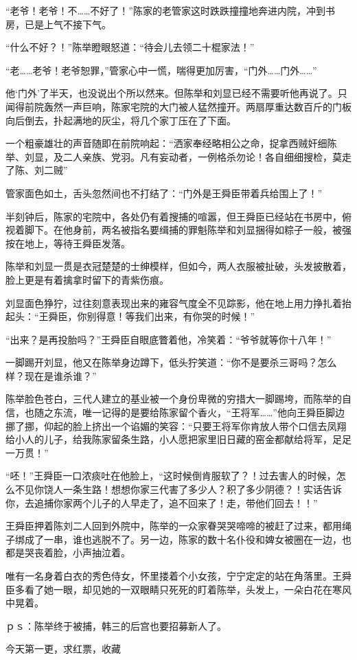 “老爷！老爷！不……不好了！”陈家的老管家这时跌跌撞撞地奔进内院，冲到书房，已是上气不接下气。

“什么不好？！”陈举瞪眼怒道：“待会儿去领二十棍家法！”

“老……老爷！老爷恕罪，”管家心中一慌，喘得更加厉害，“门外……门外……”

他‘门外’了半天，也没说出个所以然来。但陈举和刘显已经不需要听他再说了。只闻得前院轰然一声巨响，陈家宅院的大门被人猛然撞开。两扇厚重达数百斤的门板向后倒去，扑起满地的灰尘，将几个家丁压在了下面。

一个粗豪雄壮的声音随即在前院响起：“洒家奉经略相公之命，捉拿西贼奸细陈举、刘显，及二人亲族、党羽。凡有妄动者，一例格杀勿论！各自细细搜检，莫走了陈、刘二贼”

管家面色如土，舌头忽然间也不打结了：“门外是王舜臣带着兵给围上了！”

半刻钟后，陈家的宅院中，各处仍有着搜捕的喧嚣，但王舜臣已经站在书房中，俯视着脚下。在他身前，两名被指名要缉捕的罪魁陈举和刘显捆得如粽子一般，被强按在地上，等待王舜臣发落。

陈举和刘显一贯是衣冠楚楚的士绅模样，但如今，两人衣服被扯破，头发披散着，脸上更是有着擒拿时留下的青紫伤痕。

刘显面色狰狞，过往刻意表现出来的雍容气度全不见踪影，他在地上用力挣扎着抬起头：“王舜臣，你别得意！等我们出来，有你哭的时候！”

“出来？是再投胎吗？”王舜臣自眼底瞥着他，冷笑着：“爷爷就等你十八年！”

一脚踢开刘显，他又在陈举身边蹲下，低头狞笑道：“你不是要杀三哥吗？怎么样？现在是谁杀谁？”

陈举脸色苍白，三代人建立的基业被一个身份卑微的穷措大一脚踢垮，而陈举的自信，也随之东流，唯一记得的是要给陈家留个香火，“王将军……”他向王舜臣脚边挪了挪，仰起的脸上挤出一个谄媚的笑容：“只要王将军你肯放人带个口信去凤翔给小人的儿子，给我陈家留条生路，小人愿把家里旧日藏的窑金都献给将军，足足一万贯！”

“呸！”王舜臣一口浓痰吐在他脸上，“这时候倒肯服软了？！过去害人的时候，怎么不见你饶人一条生路！想想你家三代害了多少人？积了多少阴德？！实话告诉你，去追捕你家两个儿子的人早走了，追不回来了！走，带他们回去！！”

王舜臣押着陈刘二人回到外院中，陈举的一众家眷哭哭啼啼的被赶了过来，都用绳子绑成了一串，谁也逃脱不了。另一边，陈家的数十名仆役和婢女被圈在一边，也都是哭丧着脸，小声抽泣着。

唯有一名身着白衣的秀色侍女，怀里搂着个小女孩，宁宁定定的站在角落里。王舜臣多看了她一眼，却见她的一双眼睛只死死的盯着陈举，头发上，一朵白花在寒风中晃着。

ｐｓ：陈举终于被捕，韩三的后宫也要招募新人了。

今天第一更，求红票，收藏


